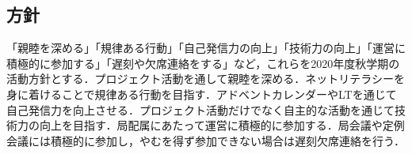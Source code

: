 \subsection*{\firstGrade{}方針}

「親睦を深める」「規律ある行動」「自己発信力の向上」「技術力の向上」「運営に積極的に参加する」「遅刻や欠席連絡をする」など，これらを\firstGrade{}2020年度秋学期の活動方針とする．プロジェクト活動を通して親睦を深める．ネットリテラシーを身に着けることで規律ある行動を目指す．アドベントカレンダーやLTを通じて自己発信力を向上させる．プロジェクト活動だけでなく自主的な活動を通じて技術力の向上を目指す．局配属にあたって運営に積極的に参加する．局会議や定例会議には積極的に参加し，やむを得ず参加できない場合は遅刻欠席連絡を行う．
